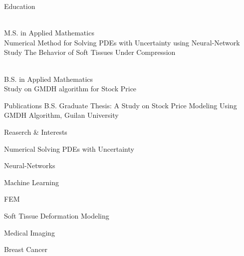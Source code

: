 \documentclass{resume} %
\begin{document}


\begin{rSection}{Education}

	 \\%
	M.S. in Applied Mathematics \smallskip \\
	Numerical Method for Solving PDEs with Uncertainty using Neural-Network \\
	Study The Behavior of Soft Tissues Under Compression
	
	
	\\ %
	B.S. in Applied Mathematics \smallskip \\
	Study on GMDH algorithm for Stock Price
\end{rSection}

\begin{rSection}{Publications}
	 B.S. Graduate Thesis: A Study on Stock Price Modeling Using GMDH Algorithm, Guilan University\\	
\end{rSection}


\begin{rSection}{Reaserch \& Interests}
	
	\begin{rSubsection}{}{}{}{}
		\item Numerical Solving PDEs with Uncertainty
		\item Neural-Networks
		\item Machine Learning
		\item FEM
		\item Soft Tissue Deformation Modeling
		\item Medical Imaging
		\item Breast Cancer
	\end{rSubsection}
	
	
\end{rSection}
\end{document}
